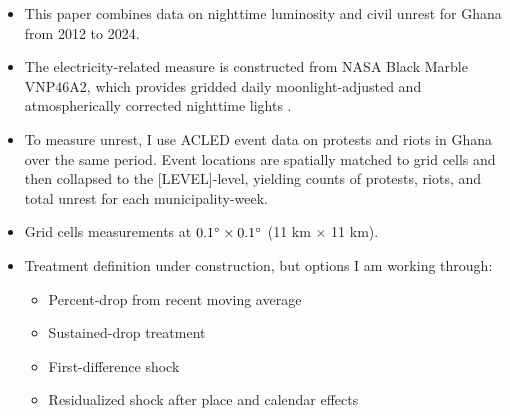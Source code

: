 \documentclass[12pt]{article}
\begin{document}
\begin{itemize}
    \item This paper combines data on nighttime luminosity and civil unrest for Ghana from 2012 to 2024. 

    \item The electricity-related measure is constructed from NASA Black Marble VNP46A2, which provides gridded daily moonlight-adjusted and atmospherically corrected nighttime lights \citep{roman2018blackmarble}.

    \item To measure unrest, I use ACLED event data on protests and riots in Ghana over the same period. Event locations are spatially matched to grid cells and then collapsed to the [LEVEL]-level, yielding counts of protests, riots, and total unrest for each municipality-week. 

    \item Grid cells measurements at $0.1\degree \times 0.1\degree$ (11 km $\times$ 11 km). 

    \item Treatment definition under construction, but options I am working through:
        \begin{itemize}
            \item Percent-drop from recent moving average
            \item Sustained-drop treatment
            \item First-difference shock
            \item Residualized shock after place and calendar effects
        \end{itemize}
\end{itemize}
\end{document}
